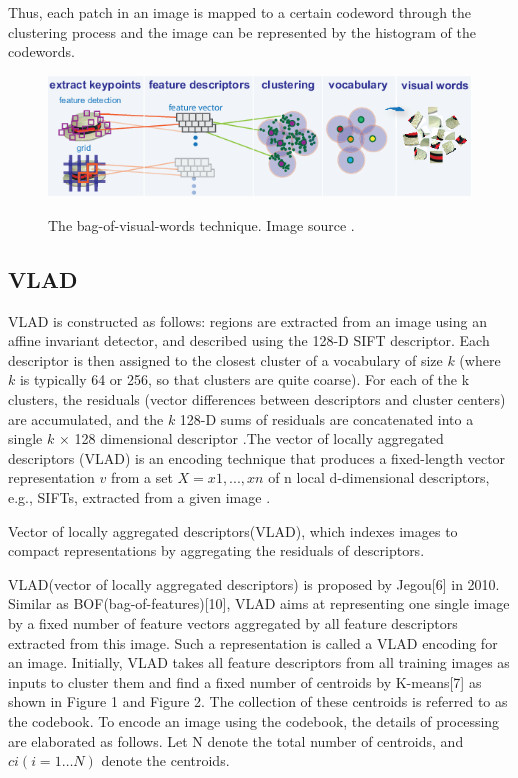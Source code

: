 \documentclass[12pt]{article}
\numberwithin{equation}{section}
\numberwithin{table}{section}
\numberwithin{figure}{section}
\begin{document}
\noindent
Thus, each patch in an image is mapped to a certain codeword through the clustering process and the image can be represented by the histogram of the codewords.

\begin{figure}[H] \centering
	\caption{The bag-of-visual-words technique. Image source \cite{mathw}. }
	\includegraphics[width=1\textwidth]{bagoffeatures_visualwordsoverview.png}
	\label{boww}
\end{figure}



\subsection{VLAD} \label{vlad}

VLAD is constructed as follows: regions are extracted from an image using an affine invariant detector, and described using the 128-D SIFT descriptor. Each descriptor is then assigned to the closest cluster of a vocabulary of size $k$ (where $k$ is typically 64 or 256, so that clusters are quite coarse). For each of the k clusters, the residuals (vector differences between descriptors and cluster centers) are accumulated, and the $k$ 128-D sums of residuals are concatenated into a single $k$ × 128 dimensional descriptor \cite{Arandjelovic2013}.The vector of locally aggregated descriptors (VLAD) is an encoding technique that produces a fixed-length vector representation $v$ from a set $X = {x1, . . . , xn}$ of n local d-dimensional descriptors, e.g., SIFTs, extracted from a given image \cite{Delhumeau2013}.

Vector of locally aggregated descriptors(VLAD), which indexes images to compact representations by aggregating the residuals of descriptors.



VLAD(vector of locally aggregated descriptors) is proposed by Jegou[6] in 2010. Similar as
BOF(bag-of-features)[10], VLAD aims at representing one single image by a fixed number of
feature vectors aggregated by all feature descriptors extracted from this image. Such a representation is called a VLAD encoding for an image. Initially, VLAD takes all feature
descriptors from all training images as inputs to cluster them and find a fixed number of centroids
by K-means[7] as shown in Figure 1 and Figure 2. The collection of these centroids is referred to
as the codebook. To encode an image using the codebook, the details of processing are elaborated
as follows. Let N denote the total number of centroids, and $ci(i=1…N)$ denote the centroids.
\end{document}
